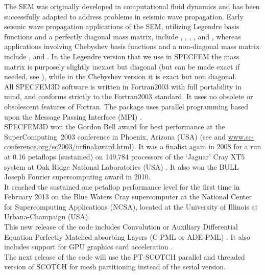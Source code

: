 The SEM was originally developed in computational fluid dynamics \citep{Pat84,MaPa89}
and has been successfully adapted to address problems in seismic wave
propagation. Early seismic wave propagation applications of the SEM,
utilizing Legendre basis functions and a perfectly diagonal mass matrix,
include \citet{CoJoTo93}, \citet{Kom97}, \citet{FaMaPaQu97}, \citet{CaGa97},
\citet{KoVi98} and \citet{KoTr99}, whereas applications involving
Chebyshev basis functions and a non-diagonal mass matrix include \citet{SePr94},
\citet{PrCaSe94} and \citet{SePrPr95}.
In the Legendre version that we use in SPECFEM the mass matrix is purposely slightly inexact but diagonal (but can be made exact if needed, see \cite{Teu15}),
while in the Chebyshev version it is exact but non diagonal.\\


All SPECFEM3D software is written in Fortran2003 with full portability
in mind, and conforms strictly to the Fortran2003 standard. It uses
no obsolete or obsolescent features of Fortran. The package uses parallel
programming based upon the Message Passing Interface (MPI) \citep{GrLuSk94,Pac97}.\\


SPECFEM3D won the Gordon Bell award for best performance at the SuperComputing~2003
conference in Phoenix, Arizona (USA) (see \citet{KoTsChTr03} and
\url{www.sc-conference.org/sc2003/nrfinalaward.html}). It was a finalist
again in 2008 for a run at 0.16 petaflops (sustained) on 149,784 processors
of the `Jaguar' Cray XT5 system at Oak Ridge National Laboratories
(USA) \citep{CaKoLaTiMiLeSnTr08}. It also won the BULL Joseph Fourier
supercomputing award in 2010.\\

It reached the sustained one petaflop performance level for the first time in February 2013
on the Blue Waters Cray supercomputer at the National Center for Supercomputing Applications (NCSA), located at the University of Illinois at Urbana-Champaign (USA).\\


This new release of the code includes Convolution or
Auxiliary Differential Equation Perfectly Matched absorbing Layers
(C-PML or ADE-PML) \citep{MaKoEz08,MaKoGe08,MaKo09,MaKoGeBr10,KoMa07}.
It also includes support for GPU graphics card acceleration \citep{Kom11,MiKo10,KoMiEr09,KoErGoMi10}.\\


The next release of the code will use the PT-SCOTCH parallel and threaded
version of SCOTCH for mesh partitioning instead of the serial version.\\


